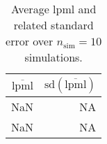 \begin{table}[H]

\caption{Average lpml and related standard error over $n_{\text{sim}} = 10$ simulations.}
\centering
\begin{tabular}[t]{rr}
\toprule
$\overbar{\text{lpml}}$ & $\text{sd}(\overbar{\text{lpml}})$\\
\midrule
NaN & NA\\
NaN & NA\\
\bottomrule
\end{tabular}
\end{table}